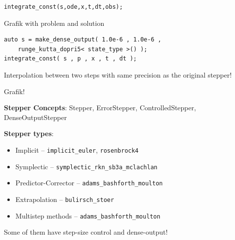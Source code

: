 \begin{frame}[fragile]

\begin{lstlisting}
integrate_const(s,ode,x,t,dt,obs);
\end{lstlisting}

Grafik with problem and solution

\end{frame}



\begin{frame}[fragile]


\vspace{2ex}
 
\begin{lstlisting}
auto s = make_dense_output( 1.0e-6 , 1.0e-6 ,
    runge_kutta_dopri5< state_type >() );
integrate_const( s , p , x , t , dt );
\end{lstlisting}

Interpolation between two steps with same precision as the original stepper!

Grafik!

\end{frame}







\begin{frame}

 \vspace{2ex}

 {\bf Stepper Concepts}: Stepper, ErrorStepper, ControlledStepper, DenseOutputStepper

 \vspace{2ex}

 {\bf Stepper types}: 
 \begin{itemize}
  \item Implicit -- {\tt implicit\_euler}, {\tt rosenbrock4}
  \item Symplectic -- {\tt symplectic\_rkn\_sb3a\_mclachlan}
  \item Predictor-Corrector -- {\tt adams\_bashforth\_moulton}
  \item Extrapolation -- {\tt bulirsch\_stoer}
  \item Multistep methods -- {\tt adams\_bashforth\_moulton}
 \end{itemize}

 \vspace{2ex}
 Some of them have step-size control and dense-output!

\end{frame}




